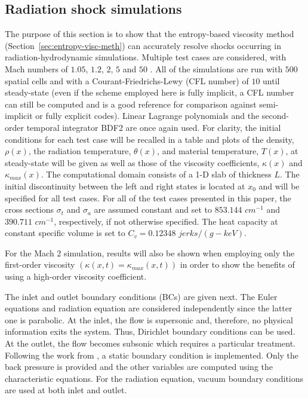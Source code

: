 \documentclass[review]{elsarticle}
\newcommand{\sect}[1]{Section~\ref{#1}}                     %
\begin{document}
\subsection{Radiation shock simulations}
\label{sec:simulations}

The purpose of this section is to show that the entropy-based viscosity method (\sect{sec:entropy-visc-meth}) can accurately resolve shocks occurring in radiation-hydrodynamic simulations. Multiple test cases are considered, with Mach numbers of $1.05$, $1.2$, $2$, $5$ and $50$ \cite{LowrieEdwards}. All of the simulations are run with $500$ spatial cells and with a Courant-Friedrichs-Lewy (CFL number) of $10$ until steady-state (even if the scheme employed here is fully implicit, a CFL number can still be computed and is a good reference for comparison against semi-implicit or fully explicit codes). Linear Lagrange polynomials and the second-order temporal integrator BDF2 are once again used. For clarity, the initial conditions for each test case will be recalled in a table and plots of the density, $\rho (x)$, the radiation temperature, $\theta (x)$, and material temperature, $T(x)$,  at steady-state will be given as well as those of the viscosity coefficients, $\kappa(x)$ and $\kappa_{max}(x)$. The computational domain consists of a 1-D slab of thickness $L$. The initial discontinuity between the left and right states is located at $x_0$ and will be specified for all test cases. For all of the test cases presented in this paper, the cross sections $\sigma_t$ and $\sigma_a$ are assumed constant and set to $853.144$ $cm^{-1}$ and $390.711$ $cm^{-1}$, respectively, if not otherwise specified. The heat capacity at constant specific volume is set to $C_v = 0.12348$ $jerks/(g-keV)$.

For the Mach $2$ simulation, results will also be shown when employing only the first-order viscosity $(\kappa(x,t) = \kappa_{max}(x,t))$ in order to show the benefits of using a high-order viscosity coefficient. 

The inlet and outlet boundary conditions (BCs) are given next. The Euler equations and radiation equation are considered independently since the latter one is parabolic. At the inlet, the flow is supersonic and, therefore, no physical information exits the system. Thus, Dirichlet boundary conditions can be used. At the outlet, the flow becomes subsonic which requires a particular treatment. Following the work from \cite{SEM}, a static boundary condition is implemented. Only the back pressure is provided and the other variables are computed using the characteristic equations. For the radiation equation, vacuum boundary conditions are used at both inlet and outlet.
\end{document}

